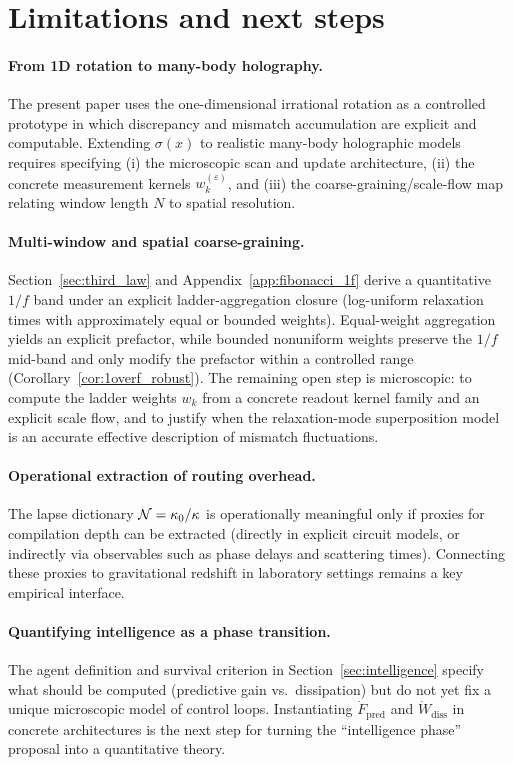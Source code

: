 \section{Limitations and next steps}
\label{app:limitations}

\paragraph{From 1D rotation to many-body holography.}
The present paper uses the one-dimensional irrational rotation as a controlled prototype in which discrepancy and mismatch accumulation are explicit and computable. Extending $\sigma(x)$ to realistic many-body holographic models requires specifying (i) the microscopic scan and update architecture, (ii) the concrete measurement kernels $w_k^{(\varepsilon)}$, and (iii) the coarse-graining/scale-flow map relating window length $N$ to spatial resolution.

\paragraph{Multi-window and spatial coarse-graining.}
Section~\ref{sec:third_law} and Appendix~\ref{app:fibonacci_1f} derive a quantitative $1/f$ band under an explicit ladder-aggregation closure (log-uniform relaxation times with approximately equal or bounded weights). Equal-weight aggregation yields an explicit prefactor, while bounded nonuniform weights preserve the $1/f$ mid-band and only modify the prefactor within a controlled range (Corollary~\ref{cor:1overf_robust}). The remaining open step is microscopic: to compute the ladder weights $w_k$ from a concrete readout kernel family and an explicit scale flow, and to justify when the relaxation-mode superposition model is an accurate effective description of mismatch fluctuations.

\paragraph{Operational extraction of routing overhead.}
The lapse dictionary $\mathcal{N}=\kappa_0/\kappa$ is operationally meaningful only if proxies for compilation depth can be extracted (directly in explicit circuit models, or indirectly via observables such as phase delays and scattering times). Connecting these proxies to gravitational redshift in laboratory settings remains a key empirical interface.

\paragraph{Quantifying intelligence as a phase transition.}
The agent definition and survival criterion in Section~\ref{sec:intelligence} specify what should be computed (predictive gain vs.\ dissipation) but do not yet fix a unique microscopic model of control loops. Instantiating $\dot F_{\mathrm{pred}}$ and $\dot W_{\mathrm{diss}}$ in concrete architectures is the next step for turning the ``intelligence phase'' proposal into a quantitative theory.


